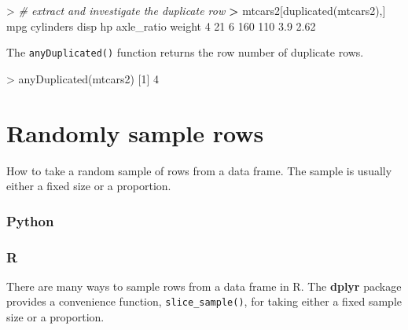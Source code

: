 \documentclass[
]{book}
\newenvironment{Shaded}{\begin{snugshade}}{\end{snugshade}}
\newcommand{\CommentTok}[1]{\textcolor[rgb]{0.56,0.35,0.01}{\textit{#1}}}
\newcommand{\DecValTok}[1]{\textcolor[rgb]{0.00,0.00,0.81}{#1}}
\newcommand{\ErrorTok}[1]{\textcolor[rgb]{0.64,0.00,0.00}{\textbf{#1}}}
\newcommand{\FloatTok}[1]{\textcolor[rgb]{0.00,0.00,0.81}{#1}}
\newcommand{\FunctionTok}[1]{\textcolor[rgb]{0.00,0.00,0.00}{#1}}
\newcommand{\NormalTok}[1]{#1}
\newcommand{\SpecialCharTok}[1]{\textcolor[rgb]{0.00,0.00,0.00}{#1}}
\begin{document}
\begin{Shaded}
\begin{Highlighting}[]
\SpecialCharTok{\textgreater{}} \CommentTok{\# extract and investigate the duplicate row}
\ErrorTok{\textgreater{}}\NormalTok{ mtcars2[}\FunctionTok{duplicated}\NormalTok{(mtcars2),]}
\NormalTok{  mpg cylinders disp  hp axle\_ratio weight}
\DecValTok{4}  \DecValTok{21}         \DecValTok{6}  \DecValTok{160} \DecValTok{110}        \FloatTok{3.9}   \FloatTok{2.62}
\end{Highlighting}
\end{Shaded}

The \texttt{anyDuplicated()} function returns the row number of duplicate rows.

\begin{Shaded}
\begin{Highlighting}[]
\SpecialCharTok{\textgreater{}} \FunctionTok{anyDuplicated}\NormalTok{(mtcars2)}
\NormalTok{[}\DecValTok{1}\NormalTok{] }\DecValTok{4}
\end{Highlighting}
\end{Shaded}

\hypertarget{randomly-sample-rows}{%
\section{Randomly sample rows}\label{randomly-sample-rows}}

How to take a random sample of rows from a data frame. The sample is usually either a fixed size or a proportion.

\hypertarget{python-22}{%
\subsubsection*{Python}\label{python-22}}

\hypertarget{r-22}{%
\subsubsection*{R}\label{r-22}}

There are many ways to sample rows from a data frame in R. The \textbf{dplyr} package provides a convenience function, \texttt{slice\_sample()}, for taking either a fixed sample size or a proportion.
\end{document}
